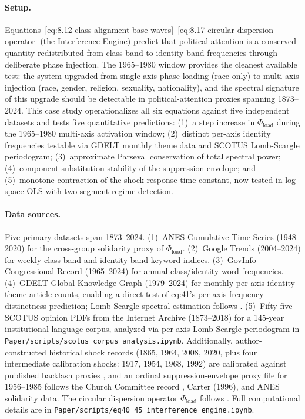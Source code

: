 \paragraph{Setup.}
Equations~\ref{eq:8.12-class-alignment-base-waves}--\ref{eq:8.17-circular-dispersion-operator} (the Interference Engine) predict that political
attention is a conserved quantity redistributed from class-band to identity-band
frequencies through deliberate phase injection. The 1965--1980 window provides the
cleanest available test: the system upgraded from single-axis phase loading (race only)
to multi-axis injection (race, gender, religion, sexuality, nationality), and the
spectral signature of this upgrade should be detectable in political-attention proxies
spanning 1873--2024. This case study operationalizes all six equations against five
independent datasets and tests five quantitative predictions: (1)~a step increase in
$\Phi_{\text{load}}$ during the 1965--1980 multi-axis activation window; (2)~distinct
per-axis identity frequencies testable via GDELT monthly theme data and SCOTUS
Lomb-Scargle periodogram; (3)~approximate Parseval conservation of total spectral
power; (4)~component substitution stability of the suppression envelope; and
(5)~monotone contraction of the shock-response time-constant, now tested in
log-space OLS with two-segment regime detection.

\paragraph{Data sources.}
Five primary datasets span 1873--2024. (1)~ANES Cumulative Time Series (1948--2020)
\cite{anes_cumulative_2022} for the cross-group solidarity proxy of $\Phi_{\text{load}}$.
(2)~Google Trends (2004--2024) \cite{google_trends_2024} for weekly class-band and
identity-band keyword indices. (3)~GovInfo Congressional Record (1965--2024)
\cite{govinfo_crec_2024} for annual class/identity word frequencies.
(4)~GDELT Global Knowledge Graph (1979--2024) \cite{gdelt_gkg_2024,leetaru_schrodt_2013}
for monthly per-axis identity-theme article counts, enabling a direct test of
eq:41's per-axis frequency-distinctness prediction; Lomb-Scargle spectral estimation
follows \cite{scargle_1982}. (5)~Fifty-five SCOTUS opinion PDFs from the Internet Archive
(1873--2018) \cite{ia_scotus_collection} for a 145-year institutional-language corpus,
analyzed via per-axis Lomb-Scargle periodogram in
\texttt{Paper/scripts/scotus\_corpus\_analysis.ipynb}.
Additionally, author-constructed historical shock records (1865, 1964, 2008, 2020, plus
four intermediate calibration shocks: 1917, 1954, 1968, 1992) are calibrated against
published backlash proxies \cite{foner_reconstruction_1988,trelease_white_terror_1971,
carter_wallace_gingrich_1996,skocpol_williamson_tea_party_2012,
splc_year_in_hate_2023,adl_center_extremism_2024}, and an ordinal suppression-envelope
proxy file for 1956--1985 follows the Church Committee record \cite{church_committee_1976},
Carter (1996), and ANES solidarity data.
The circular dispersion operator $\Phi_{\text{load}}$ follows \cite{mardia_jupp_2000}.
Full computational details are in \texttt{Paper/scripts/eq40\_45\_interference\_engine.ipynb}.

